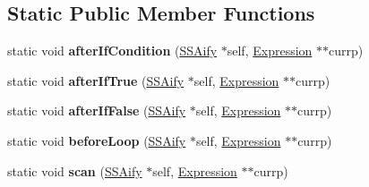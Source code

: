 \subsection*{Static Public Member Functions}
\begin{DoxyCompactItemize}
\item 
\mbox{\label{structwasm_1_1_s_s_aify_a3f1369c6324dcaf9d56254b32e04a3ab}} 
static void {\bfseries after\+If\+Condition} (\mbox{\hyperlink{structwasm_1_1_s_s_aify}{S\+S\+Aify}} $\ast$self, \mbox{\hyperlink{classwasm_1_1_expression}{Expression}} $\ast$$\ast$currp)
\item 
\mbox{\label{structwasm_1_1_s_s_aify_a58898ead766568abb5106232ac398ca6}} 
static void {\bfseries after\+If\+True} (\mbox{\hyperlink{structwasm_1_1_s_s_aify}{S\+S\+Aify}} $\ast$self, \mbox{\hyperlink{classwasm_1_1_expression}{Expression}} $\ast$$\ast$currp)
\item 
\mbox{\label{structwasm_1_1_s_s_aify_a5403815ddfe27e730dd6c4bcadef59a2}} 
static void {\bfseries after\+If\+False} (\mbox{\hyperlink{structwasm_1_1_s_s_aify}{S\+S\+Aify}} $\ast$self, \mbox{\hyperlink{classwasm_1_1_expression}{Expression}} $\ast$$\ast$currp)
\item 
\mbox{\label{structwasm_1_1_s_s_aify_accce6b5c96578e2a8cb5cbb89ff9ddf3}} 
static void {\bfseries before\+Loop} (\mbox{\hyperlink{structwasm_1_1_s_s_aify}{S\+S\+Aify}} $\ast$self, \mbox{\hyperlink{classwasm_1_1_expression}{Expression}} $\ast$$\ast$currp)
\item 
\mbox{\label{structwasm_1_1_s_s_aify_add251b4b8e5fcfa1519e522cbf88ffe1}} 
static void {\bfseries scan} (\mbox{\hyperlink{structwasm_1_1_s_s_aify}{S\+S\+Aify}} $\ast$self, \mbox{\hyperlink{classwasm_1_1_expression}{Expression}} $\ast$$\ast$currp)
\end{DoxyCompactItemize}
